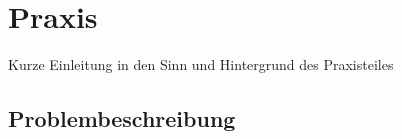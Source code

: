 \clearpage
\section{Praxis}
\label{sec:practice}

Kurze Einleitung in den Sinn und Hintergrund des Praxisteiles

\subsection{Problembeschreibung}